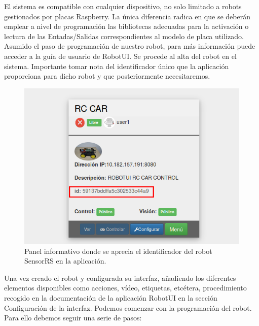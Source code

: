El sistema es compatible con cualquier dispositivo, no solo limitado a robots gestionados por placas Raspberry. La única diferencia radica en que se deberán emplear a nivel de
programación las bibliotecas adecuadas para la activación o lectura de las Entadas/Salidas correspondientes al modelo de placa utilizado.\\

Asumido el paso de programación de nuestro robot, para más información puede acceder a la guía de usuario de RobotUI. Se procede al alta del robot en el sistema.
Importante tomar nota del identificador único que la aplicación proporciona para dicho robot y que posteriormente necesitaremos.\\	

\begin{figure}[H]
  \begin{center}
    \includegraphics[scale=.6]{imagenes/manual-usuario/identificador.png}
  \end{center}
  \caption{Panel informativo donde se aprecia el identificador del robot SensorRS en la aplicación.}
  \label{website:pagina-principal}
\end{figure}

Una vez creado el robot y configurada su interfaz, añadiendo los diferentes elementos disponibles como acciones, vídeo, etiquetas, etcétera, procedimiento recogido en la documentación de la aplicación RobotUI en la sección
Configuración de la interfaz. Podemos comenzar con la programación del robot.\\

Para ello debemos seguir una serie de pasos:\\

